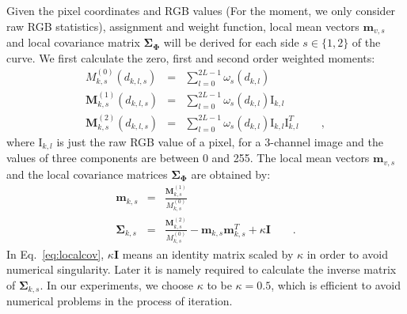 \documentclass[conference]{IEEEtran}
\begin{document}
Given the pixel coordinates and RGB values (For the moment, we only consider raw RGB
statistics), assignment and weight
function, local mean vectors $\mathbf{m}_{v,s}$  and local covariance matrix
$\mathbf{\Sigma}_{\mathbf{\Phi}}$ will be derived for each side $s \in
\{1,2\}$ of the curve.
We first calculate the zero, first and second order weighted moments:
\begin{eqnarray}
  \label{eq:localm}
  M_{k,s}^{(0)}(d_{k,l,s}) &=& \sum_{l=0}^{2L-1} \omega_s(d_{k,l})\\
  \mathbf{M}_{k,s}^{(1)}(d_{k,l,s}) &=& \sum_{l=0}^{2L-1} \omega_s(d_{k,l}) \mathrm{I}_{k,l}\\
  \mathbf{M}_{k,s}^{(2)}(d_{k,l,s}) &=& \sum_{l=0}^{2L-1} \omega_s(d_{k,l}) \mathrm{I}_{k,l}\mathrm{I}_{k,l}^T\qquad,
\end{eqnarray}
where $\mathrm{I}_{k,l}$ is just the raw RGB value of a pixel, for a
3-channel image and the values of three components
are  between 0 and 255. The local mean vectors $\mathbf{m}_{v,s}$  and
the local covariance matrices
$\mathbf{\Sigma}_{\mathbf{\Phi}}$  are obtained by:
\begin{eqnarray}
  \label{eq:localmean}
  \mathbf{m}_{k,s} &=& \frac{\mathbf{M}^{(1)}_{k,s}}{M^{(0)}_{k,s}}\\
  \label{eq:localcov}
  \mathbf{\Sigma}_{k,s} &=& \frac{\mathbf{M}^{(2)}_{k,s}}{M^{(0)}_{k,s}}
  - \mathbf{m}_{k,s}\mathbf{m}_{k,s}^T  + \kappa \mathbf{I}\qquad.
\end{eqnarray}
In Eq.~\ref{eq:localcov}, $\kappa \mathbf{I}$  means an identity matrix scaled by
$\kappa$ in order to avoid numerical singularity. Later it is namely
required to calculate the inverse matrix of
$\mathbf{\Sigma}_{k,s}$. In our experiments, we choose $\kappa$ to be
$\kappa = 0.5$, which is efficient to avoid numerical problems in the
process of iteration.
\end{document}
